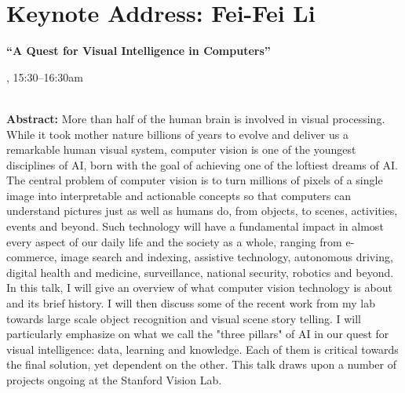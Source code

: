 \section{Keynote Address: Fei-Fei Li}

\begin{center}
\begin{Large}
{\bfseries\Large ``A Quest for Visual Intelligence in Computers''}
\vspace{1em}\par
\end{Large}

\daydateyear, 15:30--16:30am \vspace{1em}\\
\PlenaryLoc \\
\vspace{1em}\par
\end{center}

\noindent
{\bfseries Abstract:} More than half of the human brain is involved in
visual processing. While it took mother nature billions of years to
evolve and deliver us a remarkable human visual system, computer
vision is one of the youngest disciplines of AI, born with the goal of
achieving one of the loftiest dreams of AI. The central problem of
computer vision is to turn millions of pixels of a single image into
interpretable and actionable concepts so that computers can understand
pictures just as well as humans do, from objects, to scenes,
activities, events and beyond. Such technology will have a fundamental
impact in almost every aspect of our daily life and the society as a
whole, ranging from e-commerce, image search and indexing, assistive
technology, autonomous driving, digital health and medicine,
surveillance, national security, robotics and beyond. In this talk, I
will give an overview of what computer vision technology is about and
its brief history. I will then discuss some of the recent work from my
lab towards large scale object recognition and visual scene story
telling. I will particularly emphasize on what we call the "three
pillars" of AI in our quest for visual intelligence: data, learning
and knowledge. Each of them is critical towards the final solution,
yet dependent on the other. This talk draws upon a number of projects
ongoing at the Stanford Vision Lab. 

\vspace{3em}\par 

